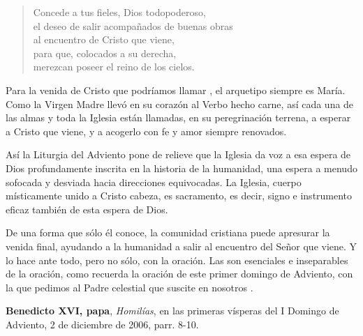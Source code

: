 \begin{liturgiabox}{}
	\begin{quote}
		Concede a tus fieles, Dios todopoderoso, \\el deseo de salir acompañados de buenas obras \\al encuentro de Cristo que viene, \\para que, colocados a su derecha, \\merezcan poseer el reino de los cielos.		
	\end{quote}	
	
	\begin{liturgiatext}
		
		Para la venida de Cristo que podríamos llamar , el arquetipo siempre es María. Como la Virgen Madre llevó en su corazón al Verbo hecho carne, así cada una de las almas y toda la Iglesia están llamadas, en su peregrinación terrena, a esperar a Cristo que viene, y a acogerlo con fe y amor siempre renovados.
		
		Así la Liturgia del Adviento pone de relieve que la Iglesia da voz a esa espera de Dios profundamente inscrita en la historia de la humanidad, una espera a menudo sofocada y desviada hacia direcciones equivocadas. La Iglesia, cuerpo místicamente unido a Cristo cabeza, es sacramento, es decir, signo e instrumento eficaz también de esta espera de Dios.
		
		De una forma que sólo él conoce, la comunidad cristiana puede apresurar la venida final, ayudando a la humanidad a salir al encuentro del Señor que viene. Y lo hace ante todo, pero no sólo, con la oración. Las  son esenciales e inseparables de la oración, como recuerda la oración de este primer domingo de Adviento, con la que pedimos al Padre celestial que suscite en nosotros .
		
		\textbf{Benedicto XVI, papa}, \emph{Homilías}, en las primeras vísperas del I Domingo de Adviento, 2 de diciembre de 2006, parr. 8-10.
	\end{liturgiatext}
	
\end{liturgiabox}	

\newpage

